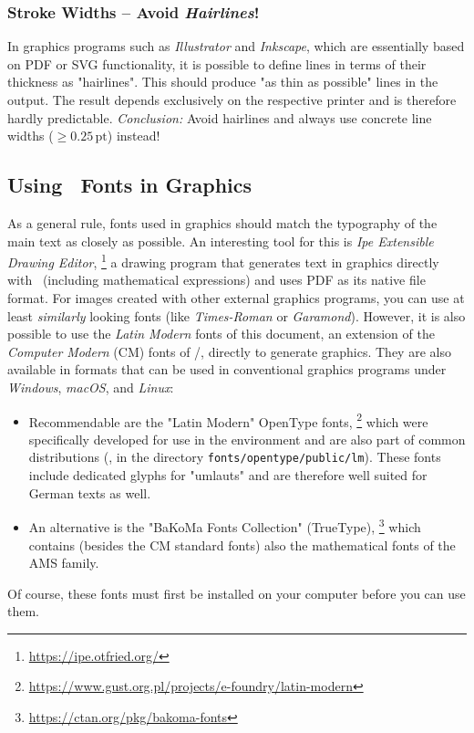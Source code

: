 \subsubsection{Stroke Widths -- Avoid \emph{Hairlines}!}

In graphics programs such as \emph{Illustrator} and \emph{Inkscape}, which
are essentially based on PDF or SVG functionality, it is possible to define
lines in terms of their thickness as "hairlines". This should produce "as
thin as possible" lines in the output. The result depends exclusively on the
respective printer and is therefore hardly predictable. \emph{Conclusion:}
Avoid hairlines and always use concrete line widths ($\geq 0.25\,
\mathrm{pt}$) instead!

\subsection{Using \tex\ Fonts in Graphics}
\label{sec:TexFontsInGraphics}

As a general rule, fonts used in graphics should match the typography of the
main text as closely as possible. An interesting tool for this is \emph{Ipe
Extensible Drawing Editor},%
\footnote{\url{https://ipe.otfried.org/}}
a drawing program that generates text in graphics directly with \latex\
(including mathematical expressions) and uses PDF as its native file format.
For images created with other external graphics programs, you can use at
least \emph{similarly} looking fonts (like \emph{Times-Roman} or
\emph{Garamond}). However, it is also possible to use the \emph{Latin Modern}
fonts of this document, an extension of the \emph{Computer Modern} (CM) fonts
of {\tex}/{\latex}, directly to generate graphics. They are also available in
formats that can be used in conventional graphics programs under
\emph{Windows}, \emph{macOS}, and \emph{Linux}:
%
\begin{itemize}
    \item
    Recommendable are the "Latin Modern" OpenType fonts,%
    \footnote{\url{https://www.gust.org.pl/projects/e-foundry/latin-modern}}
    which were specifically developed for use in the \latex environment and
    are also part of common \latex distributions (\eg, in the directory
    \nolinkurl{fonts/opentype/public/lm}). These fonts include dedicated glyphs
    for "umlauts" and are therefore well suited for German texts as well.
    \item
    An alternative is the "BaKoMa Fonts Collection" (TrueType),%
    \footnote{\url{https://ctan.org/pkg/bakoma-fonts}}
    which contains (besides the CM standard fonts) also the mathematical fonts
    of the AMS family.
\end{itemize}
%
Of course, these fonts must first be installed on your computer before
you can use them.

